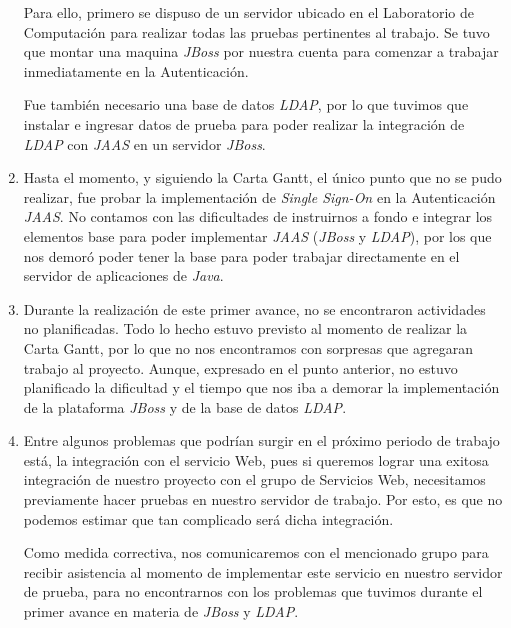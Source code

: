 \begin{enumerate}
Para ello, primero se dispuso de un servidor ubicado en el Laboratorio de
Computación para realizar todas las pruebas pertinentes al trabajo. Se tuvo que
montar una maquina \emph{JBoss} por nuestra cuenta para comenzar a trabajar
inmediatamente en la Autenticación.

Fue también necesario una base de datos \emph{LDAP}, por lo que tuvimos que instalar
e ingresar datos de prueba para poder realizar la integración de \emph{LDAP} con
\emph{JAAS} en un servidor \emph{JBoss}.\\
 

\item Hasta el momento, y siguiendo la Carta Gantt, el único punto que no se pudo
realizar, fue probar la implementación de \emph{Single Sign-On} en la
Autenticación \emph{JAAS}. No contamos con las dificultades de instruirnos a fondo
e integrar los elementos base para poder implementar \emph{JAAS} (\emph{JBoss} y
\emph{LDAP}), por los que nos demoró poder tener la base para poder trabajar
directamente en el servidor de aplicaciones de \emph{Java}.\\


\item Durante la realización de este primer avance, no se encontraron actividades no
planificadas. Todo lo hecho estuvo previsto al momento de realizar la Carta Gantt,
por lo que no nos encontramos con sorpresas que agregaran trabajo al proyecto. 
Aunque, expresado en el punto anterior, no estuvo planificado la dificultad y el
tiempo que nos iba a demorar la implementación de la plataforma \emph{JBoss} y de
la base de datos \emph{LDAP}.\\


\item Entre algunos problemas que podrían surgir en el próximo periodo de trabajo
está, la integración con el servicio Web, pues si queremos lograr una exitosa
integración de nuestro proyecto con el grupo de Servicios Web, necesitamos
previamente hacer pruebas en nuestro servidor de trabajo. Por esto, es que no
podemos estimar que tan complicado será dicha integración.

Como medida correctiva, nos comunicaremos con el mencionado grupo para recibir
asistencia al momento de implementar este servicio en nuestro servidor de prueba,
para no encontrarnos con los problemas que tuvimos durante el primer avance en
materia de \emph{JBoss} y \emph{LDAP}.
\end{enumerate}
